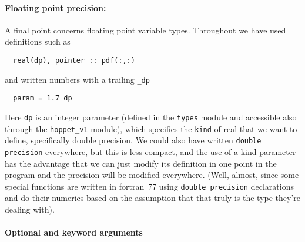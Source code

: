 \documentclass[12pt]{article}
\begin{document}
\paragraph{Floating point precision:}
A final point concerns floating point variable types. Throughout we
have used definitions such as
\begin{verbatim}
  real(dp), pointer :: pdf(:,:)
\end{verbatim}
and written numbers with a trailing \texttt{\_dp}
\begin{verbatim}
  param = 1.7_dp
\end{verbatim}
Here \texttt{dp} is an integer parameter (defined in the
\texttt{types} module and accessible also through the
\texttt{hoppet\_v1} module), which specifies the \texttt{kind} of real
that we want to define, specifically double precision. We could also
have written \texttt{double precision} everywhere, but this is less
compact, and the use of a kind parameter has the advantage that we
can just modify its definition in one point in the program and the
precision will be modified everywhere. (Well, almost, since some
special functions are written in fortran~77 using \texttt{double
  precision} declarations and do their numerics based on the
assumption that that truly is the type they're dealing with).


\paragraph{Optional and keyword arguments}
\end{document}
